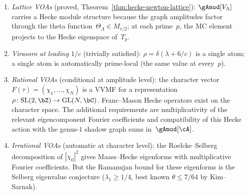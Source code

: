 \begin{remark}%
\label{rem:prime-locality-known}%
%
\mbox{}
\begin{enumerate}[label=\textup{(\roman*)}]
\item \emph{Lattice VOAs} \textup{(}proved,
 Theorem~\textup{\ref{thm:hecke-newton-lattice}}\textup{):}
 $\gAmod[V_\Lambda]$ carries a Hecke module structure
 because the graph amplitudes factor through the theta
 function~$\Theta_\Lambda \in M_{r/2}$; at each prime~$p$,
 the MC element projects to the Hecke eigenspace of~$T_p$.
\item \emph{Virasoro at leading $1/c$}
 \textup{(}trivially satisfied\textup{):}
 $\rho = \delta(\lambda + 6/c)$ is a single atom; a single
 atom is automatically prime-local (the same value at every~$p$).
\item \emph{Rational VOAs}
\textup{(}conditional at amplitude level\textup{):}
 the character vector $F(\tau) = (\chi_1,\dotsc,\chi_N)$ is
 a VVMF for a representation
 $\rho\colon\mathrm{SL}(2,\bZ) \to \mathrm{GL}(N,\bC)$.
 Franc--Mason Hecke operators exist on the character space. The
 additional requirements are multiplicativity of the relevant
 eigencomponent Fourier coefficients and compatibility of this Hecke
 action with the genus-$1$ shadow graph sums in~$\gAmod[\cA]$.
\item \emph{Irrational VOAs}
 \textup{(}automatic at character level\textup{):}
 the Roelcke--Selberg decomposition of $|\chi_0|^2$ gives
 Maass--Hecke eigenforms with multiplicative Fourier
 coefficients. But the Ramanujan bound for these eigenforms
 is the Selberg eigenvalue conjecture
 ($\lambda_1 \ge 1/4$, best known $\theta \le 7/64$
 by Kim--Sarnak).
\end{enumerate}
\end{remark}

